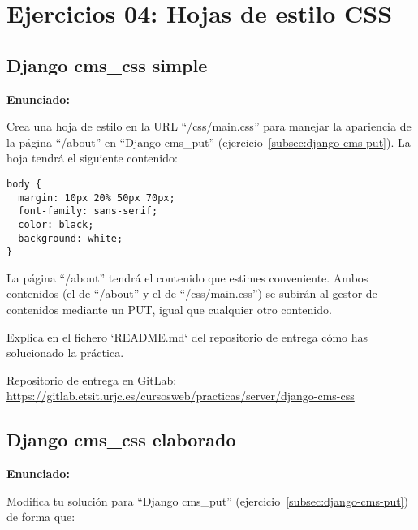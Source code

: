 \section{Ejercicios 04: Hojas de estilo CSS}

\subsection{Django cms\_css simple}
\label{subsec:django-cms-css}

\textbf{Enunciado:}

Crea una hoja de estilo en la URL ``/css/main.css'' para manejar la apariencia de la página ``/about'' en ``Django cms\_put'' (ejercicio~\ref{subsec:django-cms-put}). La hoja tendrá el siguiente contenido:

\begin{verbatim}
body {
  margin: 10px 20% 50px 70px;
  font-family: sans-serif;
  color: black;
  background: white;
}
\end{verbatim}

La página ``/about'' tendrá el contenido que estimes conveniente. Ambos contenidos (el de ``/about'' y el de ``/css/main.css'') se subirán al gestor de contenidos mediante un PUT, igual que cualquier otro contenido.

Explica en el fichero `README.md` del repositorio de entrega cómo has solucionado la práctica.

Repositorio de entrega en GitLab: \\
\url{https://gitlab.etsit.urjc.es/cursosweb/practicas/server/django-cms-css}

\subsection{Django cms\_css elaborado}
\label{subsec:django-cms-css-2}

\textbf{Enunciado:}

Modifica tu solución para ``Django cms\_put'' (ejercicio~\ref{subsec:django-cms-put}) de forma que:

